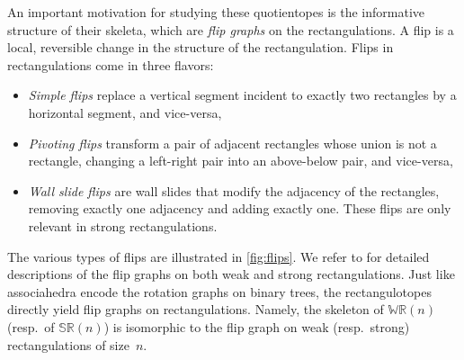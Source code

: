 \documentclass{amsart}
\theoremstyle{definition}
\newcommand{\darkblue}{\color{darkblue}} %
\newcommand{\defn}[1]{\textsl{\darkblue #1}} %
\newcommand{\polytope}[1]{\mathds{#1}} %
\newcommand{\WRP}{\polytope{WR}} %
\newcommand{\SRP}{\polytope{SR}} %
\begin{document}
An important motivation for studying these quotientopes is the informative structure of their skeleta, which are \defn{flip graphs} on the rectangulations.
A flip is a local, reversible change in the structure of the rectangulation.
Flips in rectangulations come in three flavors:
\begin{itemize}
\item \defn{Simple flips} replace a vertical segment incident to exactly two rectangles by a horizontal segment, and vice-versa,
\item \defn{Pivoting flips} transform a pair of adjacent rectangles whose union is not a rectangle, changing a left-right pair into an above-below pair, and vice-versa,
\item \defn{Wall slide flips} are wall slides that modify the adjacency of the rectangles, removing exactly one adjacency and adding exactly one. These flips are only relevant in strong rectangulations.
\end{itemize}

The various types of flips are illustrated in \cref{fig:flips}.
We refer to \cite{MR2871762,MR3878132,MR3697823,ACFF24} for detailed descriptions of the flip graphs on both weak and strong rectangulations.
Just like associahedra encode the rotation graphs on binary trees, the rectangulotopes directly yield flip graphs on rectangulations.
Namely, the skeleton of $\WRP(n)$ (resp.~of $\SRP(n)$) is isomorphic to the flip graph on weak (resp.~strong) rectangulations of size~$n$.
\end{document}
